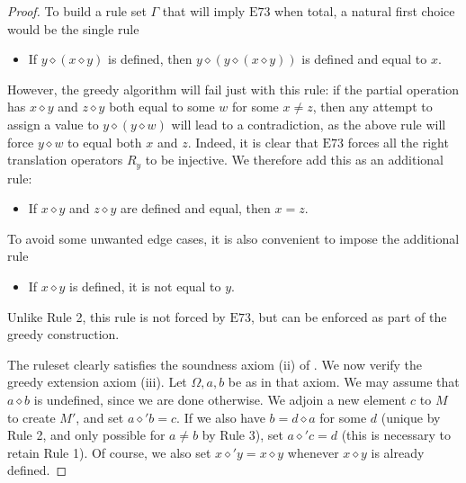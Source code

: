 \documentclass[12pt]{amsart}
\theoremstyle{definition}
\newcommand{\op}{\diamond}
\newcommand{\Eq}[1]{\mathrm{E}#1}
\begin{document}
\begin{proof} To build a rule set $\Gamma$ that will imply $\Eq{73}$ when total, a natural first choice would be the single rule
\begin{itemize}
\item[1.] If $y \op (x \op y)$ is defined, then $y \op (y \op (x \op y))$ is defined and equal to $x$.
\end{itemize}
However, the greedy algorithm will fail just with this rule: if the partial operation has $x \op y$ and $z \op y$ both equal to some $w$ for some $x \neq z$, then any attempt to assign a value to $y \op (y \op w)$ will lead to a contradiction, as the above rule will force $y \op w$ to equal both $x$ and $z$.  Indeed, it is clear that $\Eq{73}$ forces all the right translation operators $R_y$ to be injective.  We therefore add this as an additional rule:
\begin{itemize}
\item[2.] If $x \op y$ and $z \op y$ are defined and equal, then $x=z$.
\end{itemize}
To avoid some unwanted edge cases, it is also convenient to impose the additional rule
\begin{itemize}
  \item[3.] If $x \op y$ is defined, it is not equal to $y$.
\end{itemize}
Unlike Rule 2, this rule is not forced by $\Eq{73}$, but can be enforced as part of the greedy construction.

The ruleset clearly satisfies the soundness axiom (ii) of .  We now verify the greedy extension axiom (iii).  Let $\Omega,a,b$ be as in that axiom. We may assume that $a \op b$ is undefined, since we are done otherwise. We adjoin a new element $c$ to $M$ to create $M'$, and set $a \op' b = c$.  If we also have $b = d \op a$ for some $d$ (unique by Rule 2, and only possible for $a \neq b$ by Rule 3), set $a \op' c = d$ (this is necessary to retain Rule 1).  Of course, we also set $x \op' y = x \op y$ whenever $x \op y$ is already defined.


\end{proof}
\end{document}
